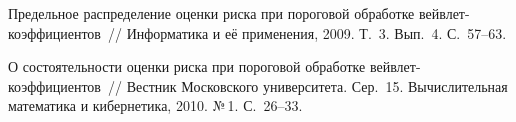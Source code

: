 \begin{multicols}{2}
{{\begin{thebibliography}{99}
Предельное распределение оценки риска при пороговой обработке вейвлет-ко\-эф\-фи\-ци\-ен\-тов~// 
Информатика и её применения, 2009. Т.~3. Вып.~4. С.~57--63.

\label{end\stat}

О состоятельности оценки риска при пороговой обработке вейвлет-ко\-эф\-фи\-ци\-ен\-тов~// Вестник Московского университета. 
Сер.~15. Вычислительная математика и кибернетика, 2010. №\,1. С.~26--33.


 \end{thebibliography}
}
}

\end{multicols}